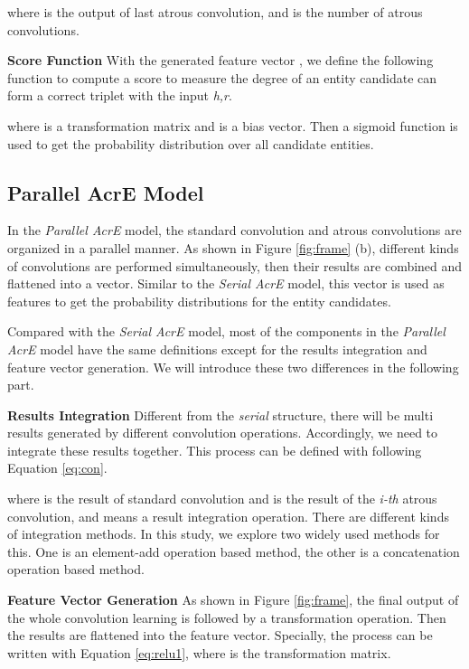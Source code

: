 \documentclass[11pt]{article}
\begin{document}
where  is the output of last atrous convolution, and  is the number of atrous convolutions.





\noindent\textbf{Score Function} With the generated feature vector , we define the following  function to compute a score to measure the degree of an entity candidate  can form a correct triplet with the input \emph{h,r}.  


where  is a transformation matrix and  is a  bias vector. 
Then a sigmoid function is used to get the probability distribution over all candidate entities.
 


\subsection{Parallel AcrE Model}
In the \emph{Parallel AcrE} model, the standard convolution and  atrous convolutions are organized in a parallel manner. As shown in Figure \ref{fig:frame} (b),  different kinds of convolutions are performed simultaneously, then their results are combined and flattened into a vector. Similar to the \emph{Serial AcrE} model, this vector  is  used as features to get the probability distributions for the entity candidates.

Compared with the \emph{Serial AcrE} model, most of the components in the \emph{Parallel AcrE} model have the same definitions except for the results integration and feature vector generation. We will introduce these two differences in the following part. 

\noindent\textbf{Results Integration} Different from the \emph{serial} structure, there will be multi results generated by different convolution operations. Accordingly, we need to integrate these results together. This process can be defined with following Equation \ref{eq:con}. 

 

where  is the result of standard convolution and  is the result of the \emph{i-th} atrous convolution, and  means a result integration operation. There are different kinds of integration methods. In this study, we explore two widely used  methods for this. One is an element-add operation based method,  the other is a  concatenation operation based method.  

\noindent\textbf{Feature Vector Generation} As shown in Figure \ref{fig:frame}, the final output of the whole convolution learning is followed by  a transformation operation. Then the results are flattened into the feature vector. Specially, the process can be written with Equation \ref{eq:relu1}, where  is the transformation matrix.
\end{document}

